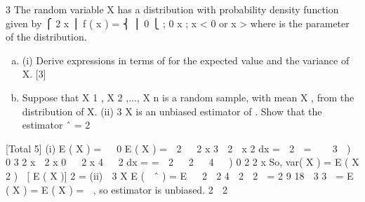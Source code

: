 \documentclass[a4paper,12pt]{article}
\begin{document}
3
The random variable X has a distribution with probability density function given by
⎧ 2 x
⎪
f ( x ) = ⎨ 
⎪ 0
⎩
; 0 \leq  x \leq \theta
; x < 0 or x > \theta
where \theta is the parameter of the distribution.
\begin{enumerate}[(a)]
\item (i)
Derive expressions in terms of \theta for the expected value and the variance of X.
[3]
\item Suppose that X 1 , X 2 ,..., X n is a random sample, with mean X , from the distribution
of X.
(ii)
3 X
is an unbiased estimator of \theta.
Show that the estimator \theta ˆ =
2
\end{enumerate}

[Total 5]
(i)
E ( X )  =  

0
E ( X )  =  
2

 2 x 3 
2 
x 2 dx  =   2   = 

  3  )  0 3
2 x
 2
x
0

 2 x 4 
 2
dx
 = 
 = 
 2 
 2
  4   ) 0 2
2 x
So, var( X )  =  E ( X 2 )  [ E ( X )] 2  = 
(ii)
 3 X
E (  ˆ )  =  E 
 2
 2 4  2  2

 = 
2
9
18
 3
3
  =  E ( X )  =  E ( X )  =   , so estimator is unbiased.
2
 2
\end{document}

